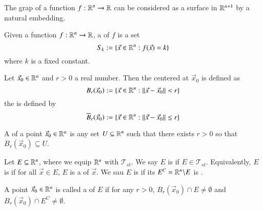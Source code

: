 \documentclass[12pt]{report}
\begin{document}
\begin{appendices}
    \begin{rmk}{}{}
        The grap of a function $f:\mathbb R^n\rightarrow \mathbb R$ can be considered as a surface in $\mathbb R^{n+1}$ by a natural embedding.
    \end{rmk}


    \begin{defn}{}{}
        Given a function $f:\mathbb R^n\rightarrow \mathbb R$, a  of $f$ is a set \begin{equation}
            S_k := \{\vec{x} \in \mathbb R^n: f(\vec{x}) = k\}
        \end{equation}
        where $k$ is a fixed constant.
    \end{defn}


    \begin{defn}{}{}
        Let $\vec{x}_0 \in \mathbb R^n$ and $r > 0$ a real number. Then the  centered at $\vec{x}_0$ is defined as \begin{equation}
            B_r(\vec{x}_0) := \{\vec{x} \in \mathbb R^n: ||\vec{x} - \vec{x}_0|| < r\}
        \end{equation}
        the  is defined by \begin{equation}
            \overline{B}_r(\vec{x}_0) := \{\vec{x} \in \mathbb R^n: ||\vec{x} - \vec{x}_0|| \leq r\}
        \end{equation}
    \end{defn}

    \begin{defn}{}{}
        A  of a point $\vec{x}_0 \in \mathbb R^n$ is any set $U \subseteq \mathbb R^n$ such that there exists $r > 0$ so that $B_r(\vec{x}_0) \subseteq U$.
    \end{defn}


    \begin{defn}{}{}
        Let $E \subseteq \mathbb R^n$, where we equip $\mathbb R^n$ with $\mathscr{T}_{st}$. We say $E$ is  if $E \in \mathscr{T}_{st}$. Equivalently, $E$ is  if for all $\vec{x} \in E$, $E$ is a  of $\vec{x}$. We sau $E$ is  if its  $E^C = \mathbb R^n\backslash E$ is .
    \end{defn}

    \begin{defn}{}{}
        A point $\vec{x}_0 \in \mathbb R^n$ is called a  of $E$ if for any $r > 0$, $B_r(\vec{x}_0) \cap E \neq \emptyset$ and $B_r(\vec{x}_0) \cap E^C \neq \emptyset$.
    \end{defn}


\end{appendices}
\end{document}
